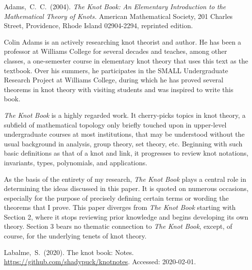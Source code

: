 \documentclass[titlepage]{article}
\newenvironment{bibcomment}{
    \item[]
    \begingroup
    \par
    \parshape0
}{
    \par
    \endgroup
}
\begin{document}
\begin{thebibliography}{1}
    Adams,~C.~C.~(2004).
    \newblock \emph{The Knot Book: An Elementary Introduction to the Mathematical Theory of Knots.}
    \newblock American Mathematical Society, 201 Charles Street, Providence, Rhode Island 02904-2294, reprinted edition.

    \begin{bibcomment}
        \setlength{\leftskip}{1cm}
        Colin Adams is an actively researching knot theorist and author. He has been a professor at Williams College for several decades and teaches, among other classes, a one-semester course in elementary knot theory that uses this text as the textbook. Over his summers, he participates in the SMALL Undergraduate Research Project at Williams College, during which he has proved several theorems in knot theory with visiting students and was inspired to write this book.\par
        \hspace{1em}\emph{The Knot Book} is a highly regarded work. It cherry-picks topics in knot theory, a subfield of mathematical topology only briefly touched upon in upper-level undergraduate courses at most institutions, that may be understood without the usual background in analysis, group theory, set theory, etc. Beginning with such basic definitions as that of a knot and link, it progresses to review knot notations, invariants, types, polynomials, and applications.\par
        \hspace{1em}As the basis of the entirety of my research, \emph{The Knot Book} plays a central role in determining the ideas discussed in this paper. It is quoted on numerous occasions, especially for the purpose of precisely defining certain terms or wording the theorems that I prove. This paper diverges from \emph{The Knot Book} starting with Section 2, where it stops reviewing prior knowledge and begins developing its own theory. Section 3 bears no thematic connection to \emph{The Knot Book}, except, of course, for the underlying tenets of knot theory.\par
    \end{bibcomment}

    Labalme,~S.~(2020).
    \newblock The knot book: Notes.
    \newblock \url{https://github.com/shadypuck/knotnotes}. Accessed: 2020-02-01.


\end{thebibliography}
\end{document}
